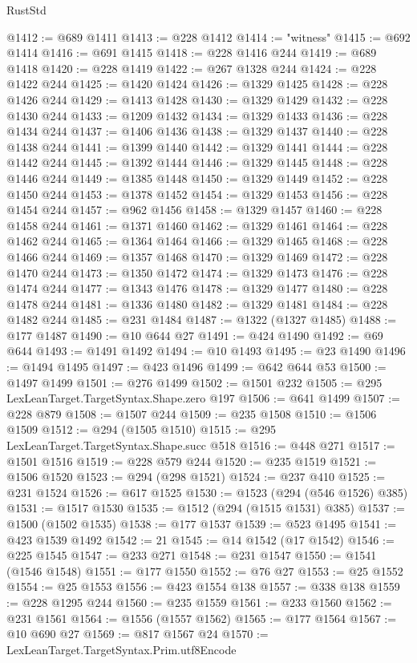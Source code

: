 \begin{lexlean}{RustStd}
\begin{coremodule}
@1412 := @689 @1411
@1413 := @228 @1412
@1414 := "witness"
@1415 := @692 @1414
@1416 := @691 @1415
@1418 := @228 @1416 @244
@1419 := @689 @1418
@1420 := @228 @1419
@1422 := @267 @1328 @244
@1424 := @228 @1422 @244
@1425 := @1420 @1424
@1426 := @1329 @1425
@1428 := @228 @1426 @244
@1429 := @1413 @1428
@1430 := @1329 @1429
@1432 := @228 @1430 @244
@1433 := @1209 @1432
@1434 := @1329 @1433
@1436 := @228 @1434 @244
@1437 := @1406 @1436
@1438 := @1329 @1437
@1440 := @228 @1438 @244
@1441 := @1399 @1440
@1442 := @1329 @1441
@1444 := @228 @1442 @244
@1445 := @1392 @1444
@1446 := @1329 @1445
@1448 := @228 @1446 @244
@1449 := @1385 @1448
@1450 := @1329 @1449
@1452 := @228 @1450 @244
@1453 := @1378 @1452
@1454 := @1329 @1453
@1456 := @228 @1454 @244
@1457 := @962 @1456
@1458 := @1329 @1457
@1460 := @228 @1458 @244
@1461 := @1371 @1460
@1462 := @1329 @1461
@1464 := @228 @1462 @244
@1465 := @1364 @1464
@1466 := @1329 @1465
@1468 := @228 @1466 @244
@1469 := @1357 @1468
@1470 := @1329 @1469
@1472 := @228 @1470 @244
@1473 := @1350 @1472
@1474 := @1329 @1473
@1476 := @228 @1474 @244
@1477 := @1343 @1476
@1478 := @1329 @1477
@1480 := @228 @1478 @244
@1481 := @1336 @1480
@1482 := @1329 @1481
@1484 := @228 @1482 @244
@1485 := @231 @1484
@1487 := @1322 (@1327 @1485)
@1488 := @177 @1487
@1490 := @10 @644 @27
@1491 := @424 @1490
@1492 := @69 @644
@1493 := @1491 @1492
@1494 := @10 @1493
@1495 := @23 @1490
@1496 := @1494 @1495
@1497 := @423 @1496
@1499 := @642 @644 @53
@1500 := @1497 @1499
@1501 := @276 @1499
@1502 := @1501 @232
@1505 := @295 LexLeanTarget.TargetSyntax.Shape.zero @197
@1506 := @641 @1499
@1507 := @228 @879
@1508 := @1507 @244
@1509 := @235 @1508
@1510 := @1506 @1509
@1512 := @294 (@1505 @1510)
@1515 := @295 LexLeanTarget.TargetSyntax.Shape.succ @518
@1516 := @448 @271
@1517 := @1501 @1516
@1519 := @228 @579 @244
@1520 := @235 @1519
@1521 := @1506 @1520
@1523 := @294 (@298 @1521)
@1524 := @237 @410
@1525 := @231 @1524
@1526 := @617 @1525
@1530 := @1523 (@294 (@546 @1526) @385)
@1531 := @1517 @1530
@1535 := @1512 (@294 (@1515 @1531) @385)
@1537 := @1500 (@1502 @1535)
@1538 := @177 @1537
@1539 := @523 @1495
@1541 := @423 @1539 @1492
@1542 := 21
@1545 := @14 @1542 (@17 @1542)
@1546 := @225 @1545
@1547 := @233 @271
@1548 := @231 @1547
@1550 := @1541 (@1546 @1548)
@1551 := @177 @1550
@1552 := @76 @27
@1553 := @25 @1552
@1554 := @25 @1553
@1556 := @423 @1554 @138
@1557 := @338 @138
@1559 := @228 @1295 @244
@1560 := @235 @1559
@1561 := @233 @1560
@1562 := @231 @1561
@1564 := @1556 (@1557 @1562)
@1565 := @177 @1564
@1567 := @10 @690 @27
@1569 := @817 @1567 @24
@1570 := LexLeanTarget.TargetSyntax.Prim.utf8Encode

\end{coremodule}
\end{lexlean}

